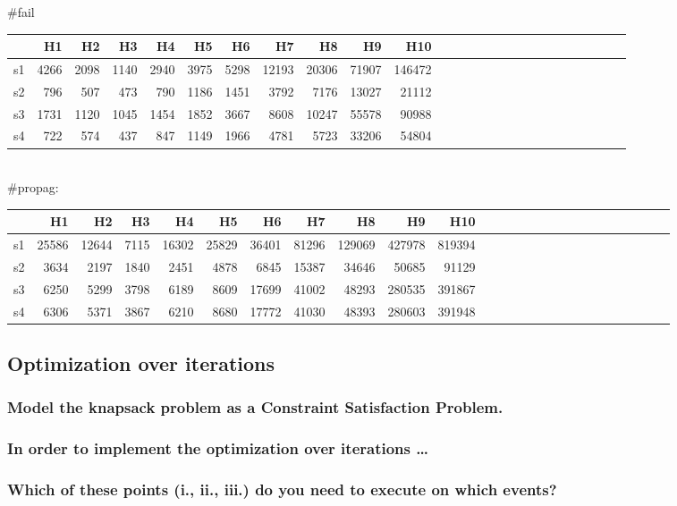 \documentclass[a4paper ,12pt,french]{article}
\begin{document}
\#fail\\
\begin{tabular}{|r||r|r|r|r|r|r|r|r|r|r|r|r|r|r|r|r|r|r|r|r|r|r|r|r|r|}
\hline
&H1&H2&H3&H4&H5&H6&H7&H8&H9&H10\\
\hline
\hline
s1&4266&2098&1140&2940&3975&5298&12193&20306&71907&146472\\
\hline
s2&796&507&473&790&1186&1451&3792&7176&13027&21112\\
\hline
s3&1731&1120&1045&1454&1852&3667&8608&10247&55578&90988\\
\hline
s4&722&574&437&847&1149&1966&4781&5723&33206&54804\\
\hline
\end{tabular}\\


\#propag:\\
\begin{tabular}{|r||r|r|r|r|r|r|r|r|r|r|r|r|r|r|r|r|r|r|r|r|r|r|r|r|r|}
\hline
&H1&H2&H3&H4&H5&H6&H7&H8&H9&H10\\
\hline
\hline
s1&25586&12644&7115&16302&25829&36401&81296&129069&427978&819394\\
\hline
s2&3634&2197&1840&2451&4878&6845&15387&34646&50685&91129\\
\hline
s3&6250&5299&3798&6189&8609&17699&41002&48293&280535&391867\\
\hline
s4&6306&5371&3867&6210&8680&17772&41030&48393&280603&391948\\
\hline
\end{tabular}


\subsection{Optimization over iterations}

\subsubsection{Model the knapsack problem as a Constraint Satisfaction Problem.}
\subsubsection{In order to implement the optimization over iterations \dots}

\subsubsection{Which of these points (i., ii., iii.) do you need to execute on which events?}
\end{document}
